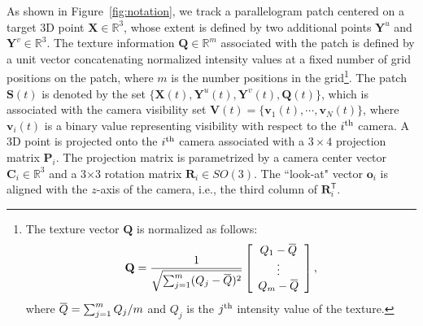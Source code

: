 \documentclass[10pt,twocolumn,letterpaper]{article}
\newcommand{\overbar}[1]{\mkern 1.5mu\overline{\mkern-1.5mu#1\mkern-1.5mu}\mkern 1.5mu}
\begin{document}
As shown in Figure~\ref{fig:notation}, we track a parallelogram patch centered on a target 3D point $\mathbf{X} \in \mathds{R}^3$, whose extent is defined by two additional points $\mathbf{Y}^u$ and $\mathbf{Y}^v \in \mathds{R}^3$. The texture information $\mathbf{Q} \in \mathds{R}^m$ associated with the patch is defined by a unit vector concatenating normalized intensity values at a fixed number of grid positions on the patch, where $m$ is the number positions in the grid\footnote{The texture vector $\mathbf{\mathbf{Q}}$ is normalized as follows:
\begin{eqnarray}
\mathbf{Q} = \frac{1}{\sqrt{\sum_{j=1}^m (Q_j-\overbar{Q})^2}} \left[\begin{array}{c}Q_1-\overbar{Q}\\\vdots\\ Q_m-\overbar{Q} \end{array}\right], \label{Eq:normalized_texture}
\end{eqnarray}
where $\overbar{Q} = \sum_{j=1}^m Q_j / m$ and $Q_j$ is the $j^{\rm th}$ intensity value of the texture.
}. 
The patch $\mathbf{S}(t)$ is denoted by the set $\{\mathbf{X}(t), \mathbf{Y}^u(t), \mathbf{Y}^v(t),\mathbf{Q}(t)\}$, which is associated with the camera visibility set $\mathbf{V}(t) = \{\mathbf{v}_1(t),\cdots,\mathbf{v}_N(t)\}$, where $\mathbf{v}_i(t)$ is a binary value representing visibility with respect to  the $i^{\rm th}$ camera. %
A 3D point is projected onto the $i^{\rm th}$ camera associated with a $3\times4$ projection matrix $\mathbf{P}_i$. The projection matrix is parametrized by a camera center vector $\mathbf{C}_i \in \mathds{R}^3$ and a 3$\times$3 rotation matrix $\mathbf{R}_i \in SO(3)$. The ``look-at" vector $\mathbf{o}_i$ is aligned with the $z$-axis of the camera, i.e., the third column of $\mathbf{R}_i^\mathsf{T}$. 
\end{document}

